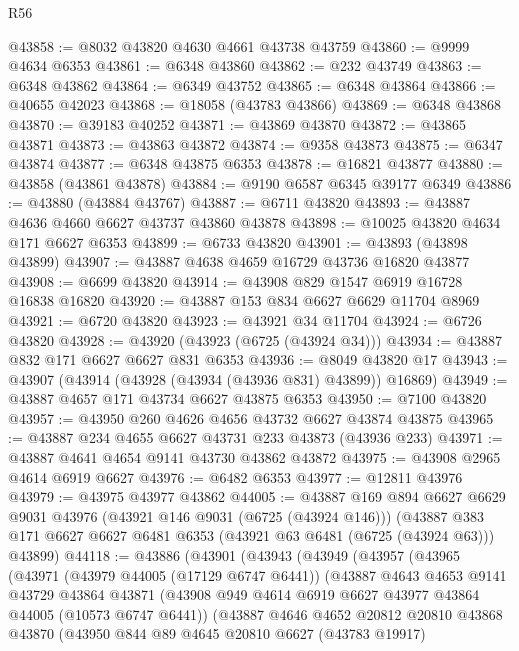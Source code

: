 \begin{lexlean}{R56}
\begin{coremodule}
@43858 := @8032 @43820 @4630 @4661 @43738 @43759
@43860 := @9999 @4634 @6353
@43861 := @6348 @43860
@43862 := @232 @43749
@43863 := @6348 @43862
@43864 := @6349 @43752
@43865 := @6348 @43864
@43866 := @40655 @42023
@43868 := @18058 (@43783 @43866)
@43869 := @6348 @43868
@43870 := @39183 @40252
@43871 := @43869 @43870
@43872 := @43865 @43871
@43873 := @43863 @43872
@43874 := @9358 @43873
@43875 := @6347 @43874
@43877 := @6348 @43875 @6353
@43878 := @16821 @43877
@43880 := @43858 (@43861 @43878)
@43884 := @9190 @6587 @6345 @39177 @6349
@43886 := @43880 (@43884 @43767)
@43887 := @6711 @43820
@43893 := @43887 @4636 @4660 @6627 @43737 @43860 @43878
@43898 := @10025 @43820 @4634 @171 @6627 @6353
@43899 := @6733 @43820
@43901 := @43893 (@43898 @43899)
@43907 := @43887 @4638 @4659 @16729 @43736 @16820 @43877
@43908 := @6699 @43820
@43914 := @43908 @829 @1547 @6919 @16728 @16838 @16820
@43920 := @43887 @153 @834 @6627 @6629 @11704 @8969
@43921 := @6720 @43820
@43923 := @43921 @34 @11704
@43924 := @6726 @43820
@43928 := @43920 (@43923 (@6725 (@43924 @34)))
@43934 := @43887 @832 @171 @6627 @6627 @831 @6353
@43936 := @8049 @43820 @17
@43943 := @43907 (@43914 (@43928 (@43934 (@43936 @831) @43899)) @16869)
@43949 := @43887 @4657 @171 @43734 @6627 @43875 @6353
@43950 := @7100 @43820
@43957 := @43950 @260 @4626 @4656 @43732 @6627 @43874 @43875
@43965 := @43887 @234 @4655 @6627 @43731 @233 @43873 (@43936 @233)
@43971 := @43887 @4641 @4654 @9141 @43730 @43862 @43872
@43975 := @43908 @2965 @4614 @6919 @6627
@43976 := @6482 @6353
@43977 := @12811 @43976
@43979 := @43975 @43977 @43862
@44005 := @43887
    @169
    @894
    @6627
    @6629
    @9031
    @43976
    (@43921 @146 @9031 (@6725 (@43924 @146)))
    (@43887 @383 @171 @6627 @6627 @6481 @6353 (@43921 @63 @6481 (@6725 (@43924 @63))) @43899)
@44118 := @43886
    (@43901
      (@43943
        (@43949
          (@43957
            (@43965
              (@43971
                (@43979 @44005 (@17129 @6747 @6441))
                (@43887
                  @4643
                  @4653
                  @9141
                  @43729
                  @43864
                  @43871
                  (@43908 @949 @4614 @6919 @6627 @43977 @43864 @44005 (@10573 @6747 @6441))
                  (@43887
                    @4646
                    @4652
                    @20812
                    @20810
                    @43868
                    @43870
                    (@43950
                      @844
                      @89
                      @4645
                      @20810
                      @6627
                      (@43783 @19917)

\end{coremodule}
\end{lexlean}
